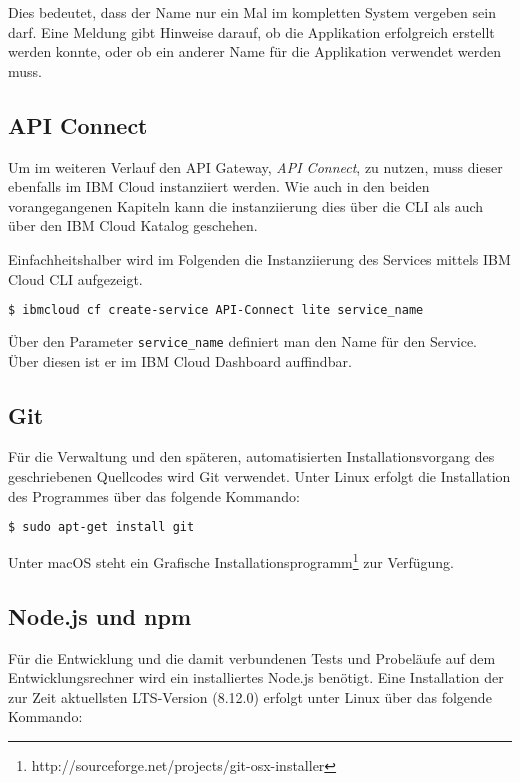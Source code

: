 Dies bedeutet, dass der Name nur ein Mal im kompletten System vergeben sein darf. Eine Meldung gibt Hinweise darauf, ob
die Applikation erfolgreich erstellt werden konnte, oder ob ein anderer Name für die Applikation verwendet werden muss.

\subsection{API Connect}
\label{subsec:apiconnect}
Um im weiteren Verlauf den API Gateway, \textit{API Connect}, zu nutzen, muss dieser ebenfalls im IBM Cloud
instanziiert werden. Wie auch in den beiden vorangegangenen Kapiteln kann die instanziierung dies über die CLI als auch
über den IBM Cloud Katalog geschehen.

Einfachheitshalber wird im Folgenden die Instanziierung des Services mittels IBM Cloud CLI aufgezeigt.

\begin{lstlisting}[language=bash, caption=Instanziierung von API Connect, label=Instanziierung von API Connect]
$ ibmcloud cf create-service API-Connect lite service_name
\end{lstlisting}

Über den Parameter \texttt{service\_name} definiert man den Name für den Service. Über diesen ist er im IBM Cloud
Dashboard auffindbar.

\subsection{Git}
Für die Verwaltung und den späteren, automatisierten Installationsvorgang des geschriebenen Quellcodes wird Git verwendet.
Unter Linux erfolgt die Installation des Programmes über das folgende Kommando:

\begin{lstlisting}[language=bash, caption=Installation von Git, label=Installation von Git]
    $ sudo apt-get install git
\end{lstlisting}

Unter macOS steht ein Grafische Installationsprogramm\footnote{http://sourceforge.net/projects/git-osx-installer} zur
Verfügung.

\subsection{Node.js und npm}
Für die Entwicklung und die damit verbundenen Tests und Probeläufe auf dem Entwicklungsrechner wird ein installiertes
Node.js benötigt. Eine Installation der zur Zeit aktuellsten LTS-Version (8.12.0) erfolgt unter Linux über das folgende
Kommando:

